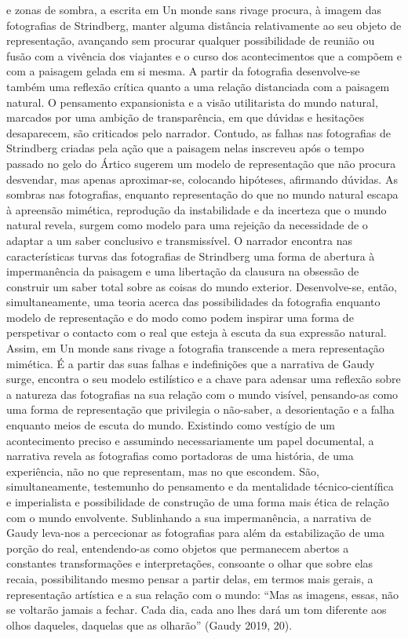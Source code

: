 \documentclass{article}
\begin{document}
e zonas de sombra, a escrita em Un monde sans rivage procura, à imagem das fotografias de Strindberg, manter alguma distância relativamente ao seu objeto de representação, avançando sem procurar qualquer possibilidade de reunião ou fusão
com a vivência dos viajantes e o curso dos acontecimentos que a compõem e com a
paisagem gelada em si mesma. A partir da fotografia desenvolve-se também uma
reflexão crítica quanto a uma relação distanciada com a paisagem natural. O pensamento expansionista e a visão utilitarista do mundo natural, marcados por uma ambição de transparência, em que dúvidas e hesitações desaparecem, são criticados pelo
narrador. Contudo, as falhas nas fotografias de Strindberg criadas pela ação que a
paisagem nelas inscreveu após o tempo passado no gelo do Ártico sugerem um modelo de representação que não procura desvendar, mas apenas aproximar-se, colocando hipóteses, afirmando dúvidas. As sombras nas fotografias, enquanto representação do que no mundo natural escapa à apreensão mimética, reprodução da instabilidade e da incerteza que o mundo natural revela, surgem como modelo para uma
rejeição da necessidade de o adaptar a um saber conclusivo e transmissível. O narrador encontra nas características turvas das fotografias de Strindberg uma forma
de abertura à impermanência da paisagem e uma libertação da clausura na obsessão
de construir um saber total sobre as coisas do mundo exterior. Desenvolve-se, então,
simultaneamente, uma teoria acerca das possibilidades da fotografia enquanto modelo de representação e do modo como podem inspirar uma forma de perspetivar o
contacto com o real que esteja à escuta da sua expressão natural.
Assim, em Un monde sans rivage a fotografia transcende a mera representação
mimética. É a partir das suas falhas e indefinições que a narrativa de Gaudy surge,
encontra o seu modelo estilístico e a chave para adensar uma reflexão sobre a natureza das fotografias na sua relação com o mundo visível, pensando-as como uma
forma de representação que privilegia o não-saber, a desorientação e a falha enquanto meios de escuta do mundo. Existindo como vestígio de um acontecimento preciso e assumindo necessariamente um papel documental, a narrativa revela as fotografias como portadoras de uma história, de uma experiência, não no que representam, mas no que escondem. São, simultaneamente, testemunho do pensamento e da
mentalidade técnico-científica e imperialista e possibilidade de construção de uma
forma mais ética de relação com o mundo envolvente. Sublinhando a sua impermanência, a narrativa de Gaudy leva-nos a percecionar as fotografias para além da estabilização de uma porção do real, entendendo-as como objetos que permanecem
abertos a constantes transformações e interpretações, consoante o olhar que sobre
elas recaia, possibilitando mesmo pensar a partir delas, em termos mais gerais, a
representação artística e a sua relação com o mundo: “Mas as imagens, essas, não se
voltarão jamais a fechar. Cada dia, cada ano lhes dará um tom diferente aos olhos
daqueles, daquelas que as olharão” (Gaudy 2019, 20).
\end{document}
